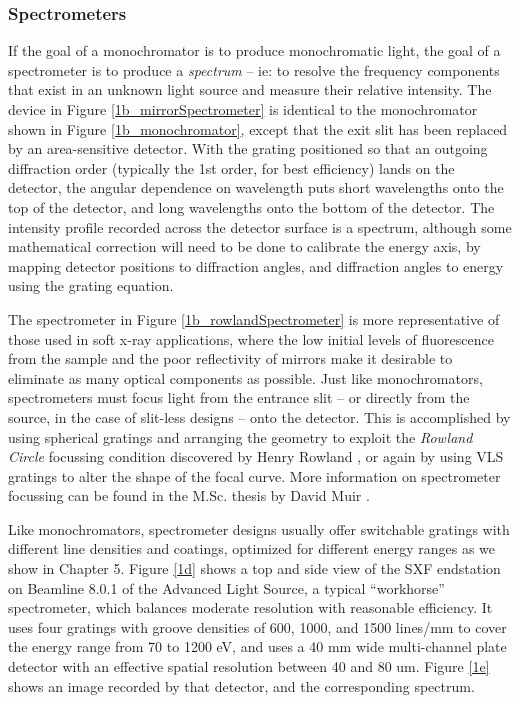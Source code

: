 \subsubsection{Spectrometers}
If the goal of a monochromator is to produce monochromatic light, the goal of a spectrometer is to produce a \emph{spectrum} -- ie: to resolve the frequency components that exist in an unknown light source and measure their relative intensity.  The device in Figure \ref{1b_mirrorSpectrometer} is identical to the monochromator shown in Figure \ref{1b_monochromator}, except that the exit slit has been replaced by an area-sensitive detector.  With the grating positioned so that an outgoing diffraction order (typically the 1st order, for best efficiency) lands on the detector, the angular dependence on wavelength puts short wavelengths onto the top of the detector, and long wavelengths onto the bottom of the detector.  The intensity profile recorded across the detector surface is a spectrum, although some mathematical correction will need to be done to calibrate the energy axis, by mapping detector positions to diffraction angles, and diffraction angles to energy using the grating equation.

The spectrometer in Figure \ref{1b_rowlandSpectrometer} is more representative of those used in soft x-ray applications, where the low initial levels of fluorescence from the sample and the poor reflectivity of mirrors make it desirable to eliminate as many optical components as possible.  Just like monochromators, spectrometers must focus light from the entrance slit -- or directly from the source, in the case of slit-less designs -- onto the detector.  This is accomplished by using spherical gratings and arranging the geometry to exploit the \emph{Rowland Circle} focussing condition discovered by Henry Rowland \cite[p.~169]{Pea97}, or again by using VLS gratings to alter the shape of the focal curve.  More information on spectrometer focussing can be found in the M.Sc. thesis by David Muir \cite{Mui06}.

Like monochromators, spectrometer designs usually offer switchable gratings with different line densities and coatings, optimized for different energy ranges as we show in Chapter 5.  Figure \ref{1d} shows a top and side view of the SXF endstation on Beamline 8.0.1 of the Advanced Light Source, a typical ``workhorse'' spectrometer, which balances moderate resolution with reasonable efficiency.  It uses four gratings with groove densities of 600, 1000, and 1500 lines/mm to cover the energy range from 70 to 1200 eV, and uses a 40 mm wide multi-channel plate detector with an effective spatial resolution between 40 and 80 um.  Figure \ref{1e} shows an image recorded by that detector, and the corresponding spectrum.


